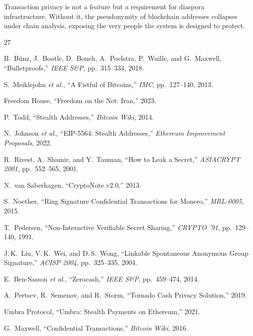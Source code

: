 \documentclass[11pt,a4paper]{article}
\begin{document}
Transaction privacy is not a feature but a requirement for diaspora
infrastructure.  Without it, the pseudonymity of blockchain addresses
collapses under chain analysis, exposing the very people the system is
designed to protect.


\begin{thebibliography}{27}

B.~B\"unz, J.~Bootle, D.~Boneh, A.~Poelstra, P.~Wuille, and G.~Maxwell,
``Bulletproofs,''
\emph{IEEE S\&P}, pp.~315--334, 2018.

S.~Meiklejohn \emph{et al.},
``A Fistful of Bitcoins,''
\emph{IMC}, pp.~127--140, 2013.

Freedom House,
``Freedom on the Net: Iran,''
2023.

P.~Todd,
``Stealth Addresses,''
\emph{Bitcoin Wiki}, 2014.

N.~Johnson \emph{et al.},
``EIP-5564: Stealth Addresses,''
\emph{Ethereum Improvement Proposals}, 2022.

R.~Rivest, A.~Shamir, and Y.~Tauman,
``How to Leak a Secret,''
\emph{ASIACRYPT 2001}, pp.~552--565, 2001.

N.~van Saberhagen,
``CryptoNote v2.0,''
2013.

S.~Noether,
``Ring Signature Confidential Transactions for Monero,''
\emph{MRL-0005}, 2015.

T.~Pedersen,
``Non-Interactive Verifiable Secret Sharing,''
\emph{CRYPTO '91}, pp.~129--140, 1991.

J.\,K.~Liu, V.\,K.~Wei, and D.\,S.~Wong,
``Linkable Spontaneous Anonymous Group Signature,''
\emph{ACISP 2004}, pp.~325--335, 2004.

E.~Ben-Sasson \emph{et al.},
``Zerocash,''
\emph{IEEE S\&P}, pp.~459--474, 2014.

A.~Pertsev, R.~Semenov, and R.~Storm,
``Tornado Cash Privacy Solution,''
2019.

Umbra Protocol,
``Umbra: Stealth Payments on Ethereum,''
2021.

G.~Maxwell,
``Confidential Transactions,''
\emph{Bitcoin Wiki}, 2016.


\end{thebibliography}
\end{document}
